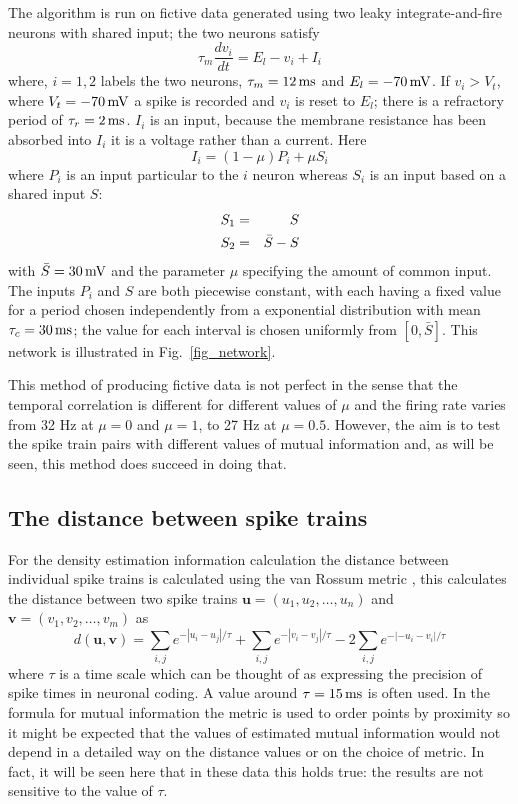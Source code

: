 \documentclass[12pt]{article}
\newcommand{\ms}{\mbox{\,ms}}
\newcommand{\mV}{\mbox{\,mV}}
\renewcommand{\u}{\mathbf{u}}
\renewcommand{\v}{\mathbf{v}}
\begin{document}
The algorithm is run on fictive data generated using two leaky
integrate-and-fire neurons with shared input; the two neurons satisfy
\begin{equation}
\tau_m \frac{dv_i}{dt}=E_l-v_i+I_i
\end{equation}
where, $i=1,2$ labels the two neurons, $\tau_m=12\ms$ and
$E_l=-70\mV$. If $v_i>V_t$, where $V_t=-70\mV$ a spike is recorded and
$v_i$ is reset to $E_l$; there is a refractory period of
$\tau_r=2\ms$. $I_i$ is an input, because the membrane resistance has
been absorbed into $I_i$ it is a voltage rather than a current. Here
\begin{equation}
I_i=(1-\mu) P_i +\mu S_i
\end{equation}
where $P_i$ is an input particular to the $i$ neuron whereas $S_i$ is an
input based on a shared input $S$:
\begin{eqnarray}
S_1&=&S\cr
S_2&=&\bar{S}-S
\end{eqnarray}
with $\bar{S}=30\mV$ and the parameter $\mu$ specifying the amount of
common input.  The inputs $P_i$ and $S$ are both piecewise constant,
with each having a fixed value for a period chosen independently from
a exponential distribution with mean $\tau_c=30\ms$; the value for
each interval is chosen uniformly from $[0,\bar{S}]$. This network is
illustrated in Fig.~\ref{fig_network}.

This method of producing fictive data is not perfect in the sense that
the temporal correlation is different for different values of $\mu$
and the firing rate varies from 32 Hz at $\mu=0$ and $\mu=1$, to 27 Hz
at $\mu=0.5$. However, the aim is to test the spike train pairs with
different values of mutual information and, as will be seen, this
method does succeed in doing that.

\subsection{The distance between spike trains}

For the density estimation information calculation the distance between individual
spike trains is calculated using the van Rossum metric
\citep{vanRossum2001}, this calculates the distance between two spike
trains $\u=(u_1,u_2,\ldots,u_n)$ and
$\v=(v_1,v_2,\ldots,v_m)$ as
\begin{equation}
d(\u,\v)=\sum_{i,j} e^{-|u_i-u_j|/\tau}+\sum_{i,j} e^{-|v_i-v_j|/\tau}-2\sum_{i,j} e^{-|-u_i-v_i|/\tau}
\end{equation}
where $\tau$ is a time scale which can be thought of as expressing the
precision of spike times in neuronal coding. A value around
$\tau=15\ms$ is often used. In the formula for mutual information the
metric is used to order points by proximity so it might be expected
that the values of estimated mutual information would not depend in a
detailed way on the distance values or on the choice of metric. In
fact, it will be seen here that in these data this holds true: the
results are not sensitive to the value of $\tau$.
\end{document}
